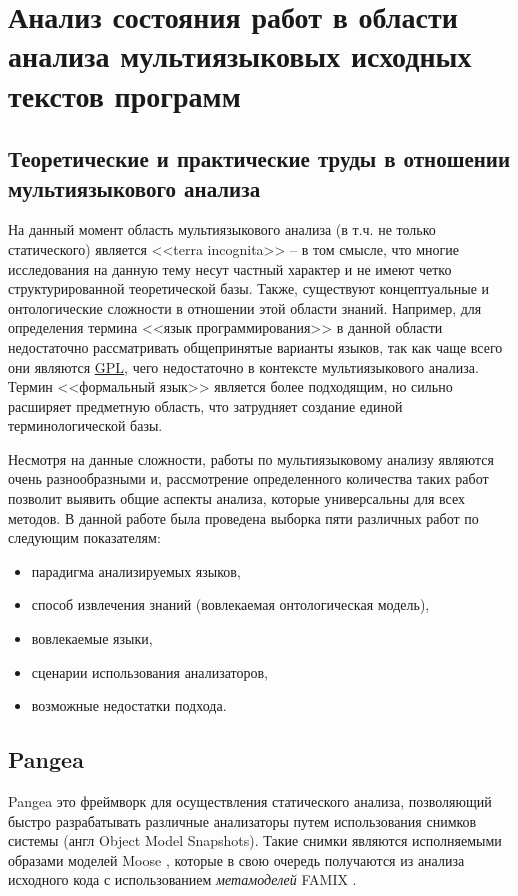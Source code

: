 \section{Анализ состояния работ в области анализа мультиязыковых исходных текстов программ}

\subsection{Теоретические и практические труды в отношении мультиязыкового анализа} \label{ssec:num2}

На данный момент область мультиязыкового анализа (в т.ч. не только статического) является
<<terra incognita>> -- в том смысле, что многие исследования на данную тему несут частный характер и не
имеют четко структурированной теоретической базы. Также, существуют концептуальные и онтологические сложности
в отношении этой области знаний. Например, для определения термина <<язык программирования>> в данной области
недостаточно рассматривать общепринятые варианты языков, так как чаще всего они являются \hyperlink{GPL}{GPL},
чего недостаточно в контексте мультиязыкового анализа. Термин <<формальный язык>> является более подходящим, но
сильно расширяет предметную область, что затрудняет создание единой терминологической базы.

Несмотря на данные сложности, работы по мультиязыковому анализу являются очень разнообразными и, рассмотрение
определенного количества таких работ позволит выявить общие аспекты анализа, которые универсальны для всех методов.
В данной работе была проведена выборка пяти различных работ по следующим показателям:
\begin{itemize}
    \item парадигма анализируемых языков,
    \item способ извлечения знаний (вовлекаемая онтологическая модель),
    \item вовлекаемые языки,
    \item сценарии использования анализаторов,
    \item возможные недостатки подхода.
\end{itemize}

\subsection{Pangea} \label{ssec:pangea}

Pangea \cite{pangea} это фреймворк для осуществления статического анализа, позволяющий
быстро разрабатывать различные анализаторы путем использования снимков системы (англ Object Model Snapshots).
Такие снимки являются исполняемыми образами моделей Moose \cite{moose}, которые в свою очередь получаются из
анализа исходного кода с использованием \textit{метамоделей} FAMIX \cite{famix}.

